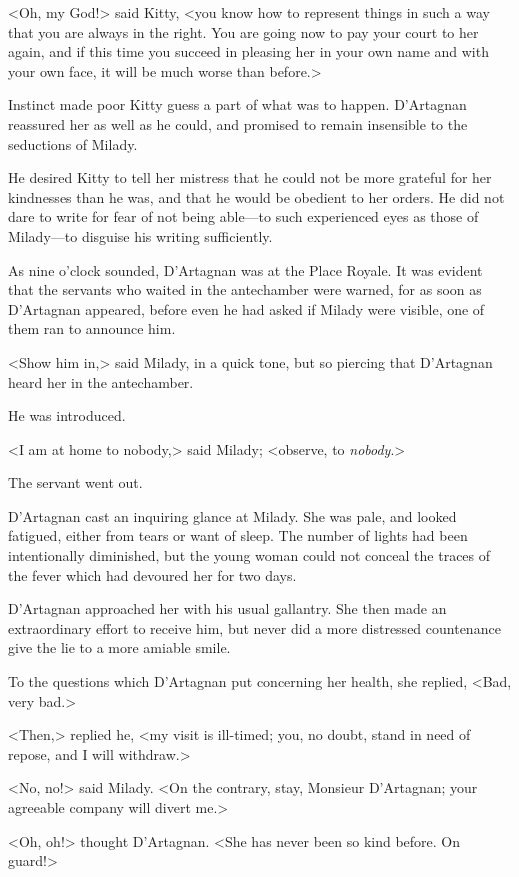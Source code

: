 <Oh, my God!> said Kitty, <you know how to represent things in such a way that you are always in the right. You are going now to pay your court to her again, and if this time you succeed in pleasing her in your own name and with your own face, it will be much worse than before.> 

Instinct made poor Kitty guess a part of what was to happen. D'Artagnan reassured her as well as he could, and promised to remain insensible to the seductions of Milady. 

He desired Kitty to tell her mistress that he could not be more grateful for her kindnesses than he was, and that he would be obedient to her orders. He did not dare to write for fear of not being able—to such experienced eyes as those of Milady—to disguise his writing sufficiently. 

As nine o'clock sounded, D'Artagnan was at the Place Royale. It was evident that the servants who waited in the antechamber were warned, for as soon as D'Artagnan appeared, before even he had asked if Milady were visible, one of them ran to announce him. 

<Show him in,> said Milady, in a quick tone, but so piercing that D'Artagnan heard her in the antechamber. 

He was introduced. 

<I am at home to nobody,> said Milady; <observe, to \emph{nobody}.> 

The servant went out. 

D'Artagnan cast an inquiring glance at Milady. She was pale, and looked fatigued, either from tears or want of sleep. The number of lights had been intentionally diminished, but the young woman could not conceal the traces of the fever which had devoured her for two days. 

D'Artagnan approached her with his usual gallantry. She then made an extraordinary effort to receive him, but never did a more distressed countenance give the lie to a more amiable smile. 

To the questions which D'Artagnan put concerning her health, she replied, <Bad, very bad.> 

<Then,> replied he, <my visit is ill-timed; you, no doubt, stand in need of repose, and I will withdraw.> 

<No, no!> said Milady. <On the contrary, stay, Monsieur D'Artagnan; your agreeable company will divert me.> 

<Oh, oh!> thought D'Artagnan. <She has never been so kind before. On guard!> 

